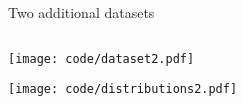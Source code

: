 \documentclass[compress]{beamer}
\begin{document}

\begin{frame}{Two additional datasets}

    \begin{columns}
        \begin{column}{0.45\linewidth}

            \texttt{[image: code/dataset2.pdf]}

            \texttt{[image: code/distributions2.pdf]}
        \end{column}
        \begin{column}{0.45\linewidth}

        \end{column}
    \end{columns}

\end{frame}
\end{document}
